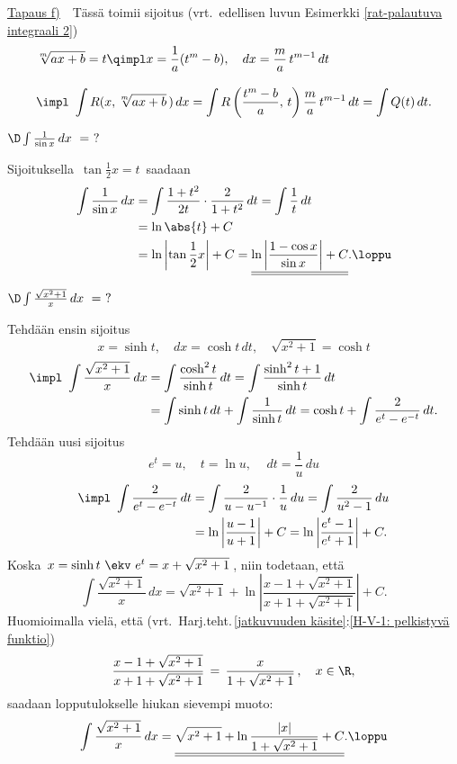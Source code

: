 \underline{Tapaus f)}\ \ Tässä toimii sijoitus 
(vrt.\ edellisen luvun Esimerkki \ref{rat-palautuva integraali 2}) 
\begin{align*}
&\sqrt[m]{ax+b}=t \qimpl x = \frac{1}{a}(t^m-b),\quad dx = \frac{m}{a}\,t^{m-1}\, dt \\[3mm]
&\impl \ \int R(x,\sqrt[m]{ax+b}\,)\, dx 
     = \int R\left(\frac{t^m-b}{a},\,t\right)\frac{m}{a}\,t^{m-1}\, dt=\int Q(t)\, dt.
\end{align*}
\begin{Exa}
$\D\int\frac{1}{\sin x}\, dx\ =\ ?$
\end{Exa}
\ratk Sijoituksella $\,\tan\frac{1}{2} x = t\,$ saadaan
\begin{align*}
\int\frac{1}{\sin x}\, dx 
  &= \int\frac{1+t^2}{2t}\cdot\frac{2}{1+t^2}\, dt =\int\frac{1}{t}\, dt \\
  &= \ln\abs{t}+C \\
  &= \ln\left|\tan\frac{1}{2}x\right|+C 
   = \underline{\underline{\ln\left|\frac{1-\cos x}{\sin x}\right|+C}}. \loppu
\end{align*}
\begin{Exa} $\D\int\frac{\sqrt{x^2+1}}{x}\,dx\ =\ ?$
\end{Exa}
\ratk Tehdään ensin sijoitus
\[
x=\sinh t,\quad dx=\cosh t\, dt,\quad \sqrt{x^2+1}=\cosh t
\]
\begin{align*}
\impl \ \int\frac{\sqrt{x^2+1}}{x}\,dx 
     &= \int\frac{\cosh^2 t}{\sinh t}\,dt = \int\frac{\sinh^2 t + 1}{\sinh t}\,dt \\
     &= \int \sinh t\,dt + \int\frac{1}{\sinh t}\,dt = \cosh t + \int \frac{2}{e^t-e^{-t}}\,dt.
\end{align*}
Tehdään uusi sijoitus 
\[
e^{t}=u,\quad t=\ln u,\quad \, dt=\frac{1}{u}\,du
\]
\begin{align*}
\impl \ \int \frac{2}{e^t-e^{-t}}\,dt 
               &= \int\frac{2}{u-u^{-1}}\cdot\frac{1}{u}\,du = \int\frac{2}{u^2-1}\,du \\
               &= \ln\left|\frac{u-1}{u+1}\right|+C = \ln\left|\frac{e^t-1}{e^t+1}\right|+C.
\end{align*}
Koska $\,x=\sinh t\ \ekv\ e^t = x+\sqrt{x^2+1}\,$, niin todetaan, että
\[
\int\frac{\sqrt{x^2+1}}{x}\,dx 
          = \sqrt{x^2+1}+\ln\left|\frac{x-1+\sqrt{x^2+1}}{x+1+\sqrt{x^2+1}}\right|+C.
\]
Huomioimalla vielä, että
(vrt.\ Harj.teht.\,\ref{jatkuvuuden käsite}:\ref{H-V-1: pelkistyvä funktio})
\[
\frac{x-1+\sqrt{x^2+1}}{x+1+\sqrt{x^2+1}} \,=\, \frac{x}{1+\sqrt{x^2+1}}\,, \quad x\in\R,
\]
saadaan lopputulokselle hiukan sievempi muoto:
\[
\int\frac{\sqrt{x^2+1}}{x}\,dx 
          = \underline{\underline{\sqrt{x^2+1}+\ln\frac{|x|}{1+\sqrt{x^2+1}}+C}}. \loppu
\]

